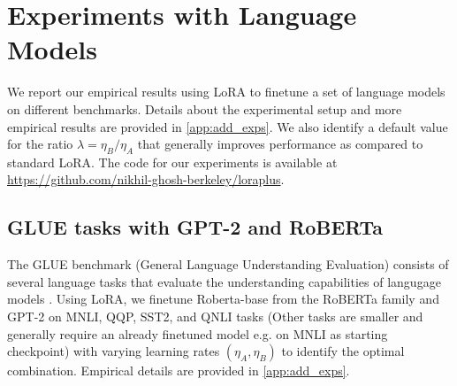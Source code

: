 
\section{Experiments with Language Models}
We report our empirical results using LoRA to finetune a set of language models on different benchmarks. Details about the experimental setup and more empirical results are provided in \cref{app:add_exps}. We also identify a default value for the ratio $\lambda = \eta_B / \eta_A$ that generally improves performance as compared to standard LoRA. The code for our experiments is available at \url{https://github.com/nikhil-ghosh-berkeley/loraplus}.
\subsection{GLUE tasks with GPT-2 and RoBERTa}
The GLUE benchmark (General Language Understanding Evaluation) consists of several language tasks that evaluate the understanding capabilities of langugage models \citep{wang2018glue}. Using LoRA, we finetune Roberta-base from the RoBERTa family \citep{liu2019roberta} and GPT-2 \citep{radford2019language} on MNLI, QQP, SST2, and QNLI tasks (Other tasks are smaller and generally require an already finetuned model e.g. on MNLI as starting checkpoint) with varying learning rates $(\eta_A, \eta_B)$ to identify the optimal combination. Empirical details are provided in \cref{app:add_exps}. 
\vspace{-0.32cm}
